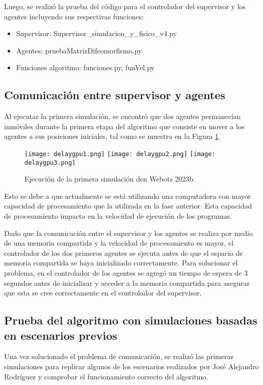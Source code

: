 Luego, se realizó la prueba del código para el controlador del supervisor y los agentes incluyendo sus respectivas funciones:
\begin{itemize}
	\item Supervisor: Supervisor\_simulacion\_y\_fisico\_v4.py
	\item Agentes: pruebaMatrizDifeomorfismo.py
	\item Funciones algoritmo: funciones.py, funVel.py
\end{itemize} 

\subsection{Comunicación entre supervisor y agentes}
Al ejecutar la primera simulación, se encontró que dos agentes permanecían inmóviles durante la primera etapa del algoritmo que consiste en mover a los agentes a sus posiciones iniciales, tal como se muestra en la Figura \ref{fig:delaygpu}.

\begin{figure}[H]
	\centering
	\texttt{[image: delaygpu1.png]}
	\texttt{[image: delaygpu2.png]}
	\texttt{[image: delaygpu3.png]}
	\caption{Ejecución de la primera simulación den Webots 2023b.}
	\label{fig:delaygpu}
\end{figure}

Esto se debe a que actualmente se está utilizando una computadora con mayor capacidad de procesamiento que la utilizada en la fase anterior. Esta capacidad de procesamiento impacta en la velocidad de ejecución de los programas. 

Dado que la comunicación entre el supervisor y los agentes se realiza por medio de una memoria compartida y la velocidad de procesamiento es mayor, el controlador de los dos primeros agentes se ejecuta antes de que el espacio de memoria compartida se haya inicializado correctamente. Para solucionar el problema, en el controlador de los agentes se agregó un tiempo de espera de 3 segundos antes de inicializar y acceder a la memoria compartida para asegurar que esta se cree correctamente en el controlador del supervisor.

\subsection{Prueba del algoritmo con simulaciones basadas en escenarios previos}
Una vez solucionado el problema de comunicación, se realizó las primeras simulaciones para replicar algunos de los escenarios realizados por José Alejandro Rodríguez \cite{RodriguezJA_2023_tesis} y comprobar el funcionamiento correcto del algoritmo. 

